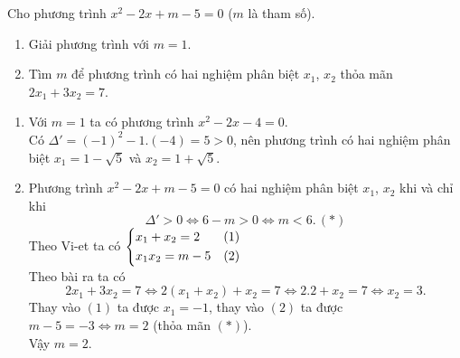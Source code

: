 \begin{ex}%
Cho phương trình $x^2-2x+m-5=0$ ($m$ là tham số).
\begin{enumerate}
	\item Giải phương trình với $m=1$.
	\item Tìm $m$ để phương trình có hai nghiệm phân biệt $x_1$, $x_2$ thỏa mãn $2x_1+3x_2=7$.
\end{enumerate}
	\loigiai
    {
\begin{enumerate}
	\item Với $m=1$ ta có phương trình $x^2-2x-4=0$.\\
	Có $\Delta'=(-1)^2-1.(-4)=5>0$, nên phương trình có hai nghiệm phân biệt $x_1=1-\sqrt{5}$ và $x_2=1+\sqrt{5}$.
	\item Phương trình $x^2-2x+m-5=0$ có hai nghiệm phân biệt $x_1$, $x_2$ khi và chỉ khi
	$$\Delta'>0\Leftrightarrow 6-m>0\Leftrightarrow m<6. \, (*)$$
	Theo Vi-et ta có $\left\{\begin{aligned}&x_1+x_2=2 &(1)\\ &x_1x_2=m-5 & (2)\end{aligned}\right.$\\
	Theo bài ra ta có 
	$$2x_1+3x_2=7\Leftrightarrow 2(x_1+x_2)+x_2=7\Leftrightarrow 2.2+x_2=7\Leftrightarrow x_2=3.$$
	Thay vào $(1)$ ta được $x_1=-1$, thay vào $(2)$ ta được $m-5=-3\Leftrightarrow m=2$ (thỏa mãn $(*)$).\\
	Vậy $m=2$.
\end{enumerate}
    }
\end{ex}

